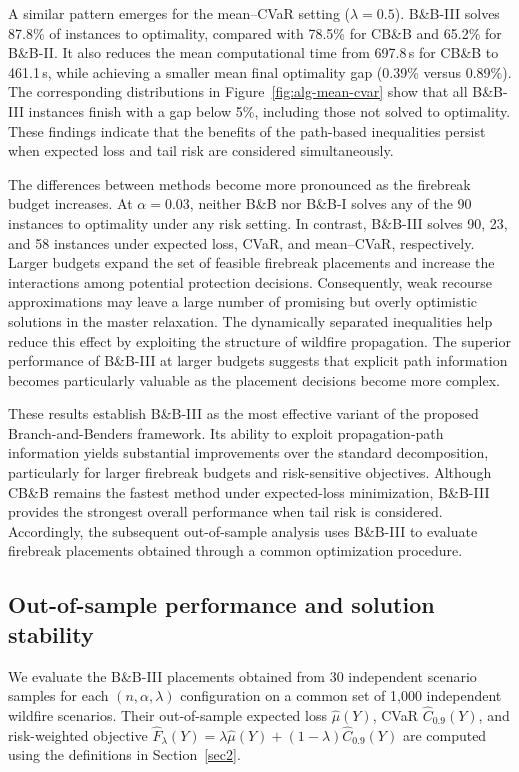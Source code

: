 \documentclass{itor}
\begin{document}
A similar pattern emerges for the mean--CVaR setting
($\lambda=0.5$). B\&B-III solves 87.8\% of instances to optimality, compared with 78.5\% for CB\&B and 65.2\% for B\&B-II. It also reduces the mean computational time from 697.8\,s for CB\&B to 461.1\,s, while achieving a smaller mean final optimality gap (0.39\% versus 0.89\%). The corresponding distributions in Figure~\ref{fig:alg-mean-cvar} show that all B\&B-III instances finish with a gap below 5\%, including those not solved to optimality. These findings indicate that the benefits of the path-based inequalities persist when expected loss and tail risk are considered simultaneously.


The differences between methods become more pronounced as the firebreak budget increases. At $\alpha=0.03$, neither B\&B nor B\&B-I solves any of the 90 instances to optimality under any risk setting. In contrast, B\&B-III solves 90, 23, and 58 instances under expected loss, CVaR, and mean--CVaR, respectively. Larger budgets expand the set of feasible firebreak placements
and increase the interactions among potential protection decisions. Consequently, weak recourse approximations may leave a large number of promising but overly optimistic solutions in the master relaxation. The dynamically separated inequalities help reduce
this effect by exploiting the structure of wildfire propagation. The superior performance of B\&B-III at larger budgets suggests that explicit path information becomes particularly valuable as the placement decisions become more complex.


These results establish B\&B-III as the most effective variant of the proposed Branch-and-Benders framework. Its ability to exploit propagation-path information yields substantial improvements over the standard decomposition, particularly for larger firebreak budgets and risk-sensitive objectives. Although CB\&B remains the fastest method under expected-loss minimization, B\&B-III provides the strongest overall performance
when tail risk is considered. Accordingly, the subsequent
out-of-sample analysis uses B\&B-III to evaluate firebreak placements obtained through a common optimization procedure.

\subsection{Out-of-sample performance and solution stability}\label{sec:oos-stability}

We evaluate the B\&B-III placements obtained from 30 independent scenario
samples for each $(n,\alpha,\lambda)$ configuration on a common set of
1,000 independent wildfire scenarios. Their out-of-sample expected loss
$\widehat\mu(Y)$, CVaR $\widehat C_{0.9}(Y)$, and risk-weighted objective
$\widehat F_\lambda(Y)=\lambda\widehat\mu(Y)
+(1-\lambda)\widehat C_{0.9}(Y)$ are computed using the definitions
in Section~\ref{sec2}. 
\end{document}
